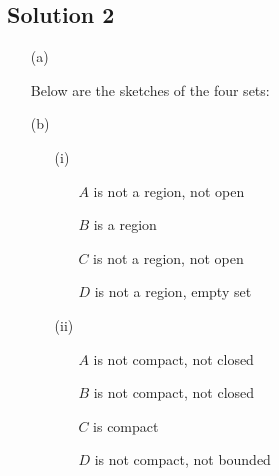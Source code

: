 \subsection*{Solution 2}

\begin{itemize}
\item[(a)]

Below are the sketches of the four sets:



\item[(b)]
\begin{itemize}
\item[(i)]

\begin{itemize}
\item[$A$] is not a region, not open
\item[$B$] is a region
\item[$C$] is not a region, not open
\item[$D$] is not a region, empty set
\end{itemize}

\item[(ii)]

\begin{itemize}
\item[$A$] is not compact, not closed
\item[$B$] is not compact, not closed
\item[$C$] is compact
\item[$D$] is not compact, not bounded
\end{itemize}

\end{itemize}

\end{itemize}

